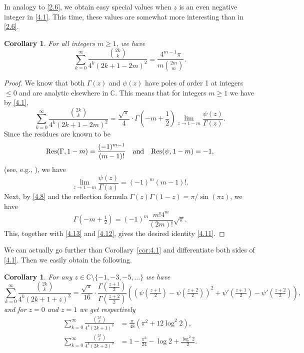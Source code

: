 \documentclass{amsart}
\newtheorem{corollary}[theorem]{Corollary}
\theoremstyle{definition}
\theoremstyle{remark}
\numberwithin{equation}{section}
\begin{document}
In analogy to \eqref{2.6}, we obtain easy special values when $z$ is an even
negative integer in \eqref{4.1}. This time, these values are somewhat more 
interesting than in \eqref{2.6}.

\begin{corollary}\label{cor:4.3}
For all integers $m\geq 1$, we have
\begin{equation}\label{4.11}
\sum_{k=0}^\infty\frac{\binom{2k}{k}}{4^k(2k+1-2m)^2}
=\frac{4^{m-1}\pi}{m\binom{2m}{m}}.
\end{equation}
\end{corollary}

\begin{proof}
We know that both $\Gamma(z)$ and $\psi(z)$ have poles of order 1 at integers
$\leq 0$ and are analytic elsewhere in $\mathbb C$. This means that for 
integers $m\geq 1$ we have by \eqref{4.1},
\begin{equation}\label{4.12}
\sum_{k=0}^\infty\frac{\binom{2k}{k}}{4^k(2k+1-2m)^2}
=\frac{\sqrt{\pi}}{4}\cdot\Gamma(-m+\frac{1}{2})
\lim_{z\to 1-m}\frac{\psi(z)}{\Gamma(z)}.
\end{equation}
Since the residues are known to be 
\[
{\rm Res}(\Gamma,1-m)=\frac{(-1)^{m-1}}{(m-1)!}\quad\hbox{and}\quad
{\rm Res}(\psi, 1-m)=-1,
\]
(see, e.g., \cite[Sect.~5.2(i)]{DLMF}), we have
\begin{equation}\label{4.13}
\lim_{z\to 1-m}\frac{\psi(z)}{\Gamma(z)}=(-1)^m(m-1)!.
\end{equation}
Next, by \eqref{4.8} and the reflection formula 
$\Gamma(z)\Gamma(1-z)=\pi/\sin(\pi z)$, we have
\begin{equation}\label{4.14}
\Gamma(-m+\tfrac{1}{2})=(-1)^m\frac{m!4^m}{(2m)!}\sqrt{\pi}.
\end{equation}
This, together with \eqref{4.13} and \eqref{4.12}, gives the desired identity
\eqref{4.11}.
\end{proof}

We can actually go further than Corollary~\ref{cor:4.1} and differentiate 
both sides of \eqref{4.1}. Then we easily obtain the following.

\begin{corollary}\label{cor:4.4}
For any $z\in{\mathbb C}\setminus\{-1,-3,-5,\ldots\}$ we have
\begin{equation}\label{4.15}
\sum_{k=0}^\infty\frac{\binom{2k}{k}}{4^k(2k+1+z)^3}
=\frac{\sqrt{\pi}}{16}\cdot\frac{\Gamma(\frac{z+1}{2})}{\Gamma(\frac{z+2}{2})}
\left(\left(\psi(\tfrac{z+1}{2})-\psi(\tfrac{z+2}{2})\right)^2
+\psi'(\tfrac{z+1}{2})-\psi'(\tfrac{z+2}{2})\right),
\end{equation}
and for $z=0$ and $z=1$ we get respectively
\begin{align}
\sum_{k=0}^\infty\frac{\binom{2k}{k}}{4^k(2k+1)^3}
&= \frac{\pi}{48}\left(\pi^2+12\log^2{2}\right),\label{4.16}\\
\sum_{k=0}^\infty\frac{\binom{2k}{k}}{4^k(2k+2)^3}
&= 1-\frac{\pi^2}{24}-\log{2}+\frac{\log^2{2}}{2}.\label{4.17}
\end{align}
\end{corollary}
\end{document}
